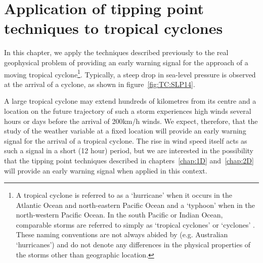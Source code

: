
\chapter{Application of tipping point techniques to tropical cyclones}
\label{chap:cyclones}
\graphicspath{{Chap_Cyclones/Figs/}} %

In this chapter, we apply the techniques described previously to the real geophysical problem of providing an early warning signal for the approach of a moving tropical cyclone\footnote{A tropical cyclone is referred to as a ‘hurricane' when it occurs in the Atlantic Ocean and north-eastern Pacific Ocean  and a ‘typhoon' when in the north-western Pacific Ocean. In the south Pacific or Indian Ocean, comparable storms are referred to simply as ‘tropical cyclones' or ‘cyclones' \citep{NOAA_cyclones}. These naming conventions are not always abided by (e.g. Australian ‘hurricanes') and do not denote any differences in the physical properties of the storms other than geographic location.}. Typically, a steep drop in sea-level pressure is observed at the arrival of a cyclone, as shown in figure~\ref{fig:TC:SLP14}. {}

A large tropical cyclone may extend hundreds of kilometres from its centre and a location on the future trajectory of such a storm experiences high winds several hours or days before the arrival of 200km/h winds. We expect, therefore, that the study of the weather variable at a fixed location will provide an early warning signal for the arrival of a tropical cyclone. The rise in wind speed itself acts as such a signal in a short (12 hour) period, but we are interested in the possibility that the tipping point techniques described in chapters~\ref{chap:1D} and~\ref{chap:2D} will provide an early warning signal when applied in this context.

